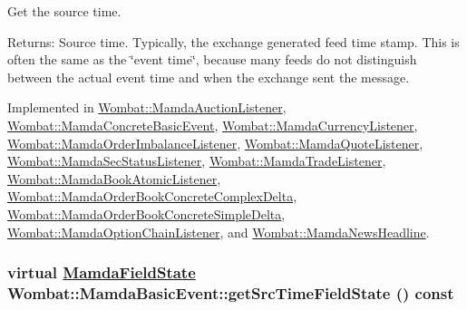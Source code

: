 Get the source time. 

\begin{Desc}
\item[Returns:]Source time. Typically, the exchange generated feed time stamp. This is often the same as the \char`\"{}event time\char`\"{}, because many feeds do not distinguish between the actual event time and when the exchange sent the message. \end{Desc}


Implemented in \hyperlink{classWombat_1_1MamdaAuctionListener_4632a4659cd012dee4d8059ee7fab6c7}{Wombat::Mamda\-Auction\-Listener}, \hyperlink{classWombat_1_1MamdaConcreteBasicEvent_9456eab113f2c1b7d5cd7cc5183495d7}{Wombat::Mamda\-Concrete\-Basic\-Event}, \hyperlink{classWombat_1_1MamdaCurrencyListener_04fcdfcdc9376b9a0daf71773e28b58e}{Wombat::Mamda\-Currency\-Listener}, \hyperlink{classWombat_1_1MamdaOrderImbalanceListener_62085e018b55aee3a14325d692dea2c5}{Wombat::Mamda\-Order\-Imbalance\-Listener}, \hyperlink{classWombat_1_1MamdaQuoteListener_3632c2277d9c0a6bf0882f484966f71c}{Wombat::Mamda\-Quote\-Listener}, \hyperlink{classWombat_1_1MamdaSecStatusListener_75adf29cbb39a3060b593f6bb43a7d42}{Wombat::Mamda\-Sec\-Status\-Listener}, \hyperlink{classWombat_1_1MamdaTradeListener_913b0f0e63ffde58f3f01a11d551bc9c}{Wombat::Mamda\-Trade\-Listener}, \hyperlink{classWombat_1_1MamdaBookAtomicListener_a43104e4c912b926990c05ff0f35ef02}{Wombat::Mamda\-Book\-Atomic\-Listener}, \hyperlink{classWombat_1_1MamdaOrderBookConcreteComplexDelta_a35d38983bbb09784e4d7fd7be18ece4}{Wombat::Mamda\-Order\-Book\-Concrete\-Complex\-Delta}, \hyperlink{classWombat_1_1MamdaOrderBookConcreteSimpleDelta_47e5a10b4cdcaa31db65651bbbafd159}{Wombat::Mamda\-Order\-Book\-Concrete\-Simple\-Delta}, \hyperlink{classWombat_1_1MamdaOptionChainListener_7efc05e17f323d3b3fe4da601048886b}{Wombat::Mamda\-Option\-Chain\-Listener}, and \hyperlink{classWombat_1_1MamdaNewsHeadline_e60a4e0f0d97fa42880b4def483b92f9}{Wombat::Mamda\-News\-Headline}.\hypertarget{classWombat_1_1MamdaBasicEvent_9cd58f3d7b5ebea42fa86e5dde46ab18}{
\subsubsection[getSrcTimeFieldState]{\setlength{\rightskip}{0pt plus 5cm}virtual \hyperlink{namespaceWombat_93aac974f2ab713554fd12a1fa3b7d2a}{Mamda\-Field\-State} Wombat::Mamda\-Basic\-Event::get\-Src\-Time\-Field\-State () const}}
\label{classWombat_1_1MamdaBasicEvent_9cd58f3d7b5ebea42fa86e5dde46ab18}


